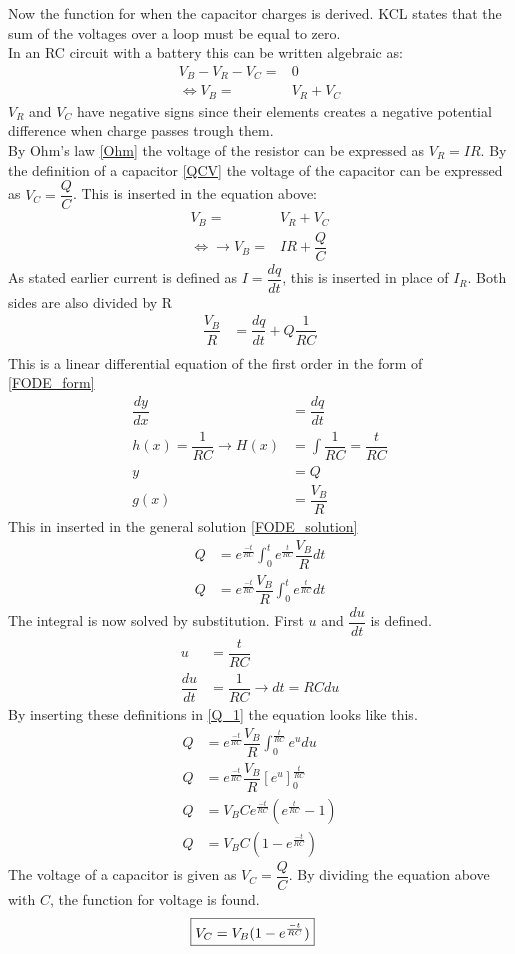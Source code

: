 Now the function for when the capacitor charges is derived. KCL states that the sum of the voltages over a loop must be equal to zero. 
\\
In an RC circuit with a battery this can be written algebraic as:
\begin{align*}
V_B-V_R-V_C =& 0 \\
\Leftrightarrow V_B=&V_R+V_C
\end{align*}
$V_R$ and $V_C$ have negative signs since their elements creates a negative potential difference when charge passes trough them.
\\
By Ohm's law \eqref{Ohm} the voltage of the resistor can be expressed as $V_R=IR$. By the definition of a capacitor \eqref{QCV} the voltage of the capacitor can be expressed as $V_C=\dfrac{Q}{C}$. This is inserted in the equation above:
\begin{align*}
V_B=&V_R+V_C \\
\Leftrightarrow \rightarrow V_B =& IR+\dfrac{Q}{C}
\end{align*}
As stated earlier current is defined as $I =\dfrac{dq}{dt}$, this is inserted in place of $I_R$. Both sides are also divided by R
\begin{align*}
\dfrac{V_B}{R} &= \dfrac{dq}{dt} + Q\dfrac{1}{RC} \\
\end{align*}
This is a linear differential equation of the first order in the form of \eqref{FODE_form}
\begin{align*}
\dfrac{dy}{dx}&=\dfrac{dq}{dt}
\\
h(x)=\dfrac{1}{RC} \rightarrow H(x)&=\int \dfrac{1}{RC}=\dfrac{t}{RC}
\\
y &= Q
\\
g(x)&= \dfrac{V_B}{R}
\end{align*}
This in inserted in the general solution \eqref{FODE_solution}
\begin{align}
Q&= e^{\frac{-t}{RC}}\int_{0}^{t}e^{\frac{t}{RC}}\dfrac{V_B}{R}dt
\\
Q&= e^{\frac{-t}{RC}}\dfrac{V_B}{R}\int_{0}^{t}e^{\frac{t}{RC}}dt \label{Q_1}
\end{align}
The integral is now solved by substitution. First $u$ and $\dfrac{du}{dt}$ is defined.
\begin{align*}
u &= \dfrac{t}{RC}
\\
\dfrac{du}{dt}&=\dfrac{1}{RC}\rightarrow dt =RC du
\end{align*} 
By inserting these definitions in \eqref{Q_1} the equation looks like this.
\begin{align*}
Q&=e^{\frac{-t}{RC}}\dfrac{V_B}{R}\int_{0}^{\frac{t}{RC}}e^u du
\\
Q&=e^{\frac{-t}{RC}}\dfrac{V_B}{R}[e^u]_{0}^{\frac{t}{RC}}
\\
Q&=V_B C e^{\frac{-t}{RC}}(e^{\frac{t}{RC}}-1)
\\
Q&=V_B C (1-e^{\frac{-t}{RC}})
\end{align*} 
The voltage of a capacitor is given as $V_C=\dfrac{Q}{C}$. By dividing the equation above with $C$, the function for voltage is found.
\begin{align}
\label{V_up}
\Aboxed{
V_C=V_B(1-e^{\frac{-t}{RC}})
}
\end{align}
